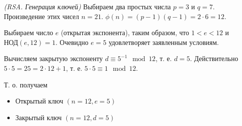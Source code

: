 \begin{example}
\emph{(RSA. Генерация ключей)}
Выбираем два простых числа  $p = 3$ и $q = 7$. Произведение этих чисел $n = 21$. 
\(
\phi\left(n\right)=\left(p - 1 \right)\left(q - 1 \right) = 2 \cdot 6 = 12
\). 

Выбираем число $e$  (открытая экспонента), таким образом, что $1 < e < 12$ и  
$\mbox{НОД}\left( e, 12 \right) = 1$. Очевидно $e = 5$ удовлетворяет заявленным условиям. 

Вычисляем закрытую экспоненту $d \equiv 5^{-1} \mod{12}$, т. е. $d = 5$. 
Действительно $5 \cdot 5 = 25 = 2 \cdot 12 + 1$, т. е. $5 \cdot 5 \equiv 1 \mod{12}$.

Т. о. получаем
\begin{itemize}
\item Открытый ключ $\left(n=12, e=5\right)$
\item Закрытый ключ $\left(n=12, d=5\right)$
\end{itemize}
\label{exAddRSAKeyGen}
\end{example}
